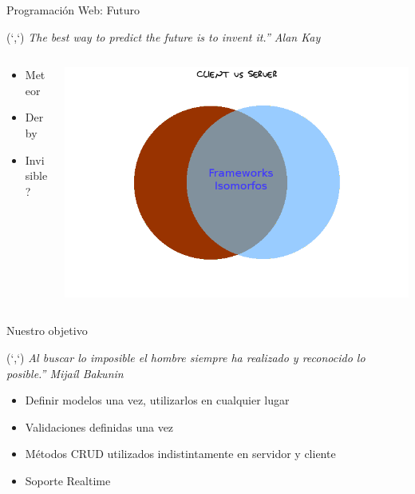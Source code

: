 \documentclass[xcolor=dvipsnames, 14pt]{beamer}
\newenvironment{reference}[2]{%
  \begin{textblock*}{\textwidth}(#1,#2)
      \footnotesize\it\bgroup\color{gray!50!black}}{\egroup\end{textblock*}}
\begin{document}
\begin{frame}{Programación Web: Futuro}
\begin{reference}{4mm}{13mm}
``The best way to predict the future is to invent it.'' Alan Kay
\end{reference}

\begin{columns}
    \begin{column}{0.3\textwidth}
        \begin{itemize}
            \item Meteor
            \item Derby
            \item Invisible?
        \end{itemize}
    \end{column}
    \begin{column}{0.7\textwidth}
        \begin{center}
            \includegraphics[width=\textwidth]{img/futuro.png}
        \end{center}
    \end{column}
\end{columns}

\end{frame}

\begin{frame}{Nuestro objetivo}
\begin{reference}{4mm}{13mm}
``Al buscar lo imposible el hombre siempre ha realizado y reconocido lo posible.'' Mijaíl Bakunin
\end{reference}

\begin{itemize}
    \item Definir modelos una vez, utilizarlos en cualquier lugar
    \item Validaciones definidas una vez
    \item Métodos CRUD utilizados indistintamente en servidor y cliente
    \item Soporte Realtime
\end{itemize}

\end{frame}
\end{document}

